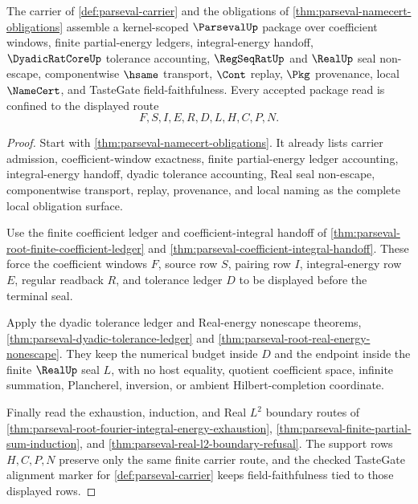 \begin{theorem}
\label{thm:parseval-kernel-scope-package}
The carrier of \autoref{def:parseval-carrier} and the obligations of \autoref{thm:parseval-namecert-obligations} assemble a kernel-scoped $\ParsevalUp$ package over coefficient windows, finite partial-energy ledgers, integral-energy handoff, $\DyadicRatCoreUp$ tolerance accounting, $\RegSeqRatUp$ and $\RealUp$ seal non-escape, componentwise $\hsame$ transport, $\Cont$ replay, $\Pkg$ provenance, local $\NameCert$, and TasteGate field-faithfulness. Every accepted package read is confined to the displayed route
$$
F,S,I,E,R,D,L,H,C,P,N .
$$
\end{theorem}
\begin{proof}
Start with \autoref{thm:parseval-namecert-obligations}. It already lists carrier admission, coefficient-window exactness, finite partial-energy ledger accounting, integral-energy handoff, dyadic tolerance accounting, Real seal non-escape, componentwise transport, replay, provenance, and local naming as the complete local obligation surface.

Use the finite coefficient ledger and coefficient-integral handoff of \autoref{thm:parseval-root-finite-coefficient-ledger} and \autoref{thm:parseval-coefficient-integral-handoff}. These force the coefficient windows $F$, source row $S$, pairing row $I$, integral-energy row $E$, regular readback $R$, and tolerance ledger $D$ to be displayed before the terminal seal.

Apply the dyadic tolerance ledger and Real-energy nonescape theorems, \autoref{thm:parseval-dyadic-tolerance-ledger} and \autoref{thm:parseval-root-real-energy-nonescape}. They keep the numerical budget inside $D$ and the endpoint inside the finite $\RealUp$ seal $L$, with no host equality, quotient coefficient space, infinite summation, Plancherel, inversion, or ambient Hilbert-completion coordinate.

Finally read the exhaustion, induction, and Real $L^2$ boundary routes of \autoref{thm:parseval-root-fourier-integral-energy-exhaustion}, \autoref{thm:parseval-finite-partial-sum-induction}, and \autoref{thm:parseval-real-l2-boundary-refusal}. The support rows $H,C,P,N$ preserve only the same finite carrier route, and the checked TasteGate alignment marker for \autoref{def:parseval-carrier} keeps field-faithfulness tied to those displayed rows.
\end{proof}

